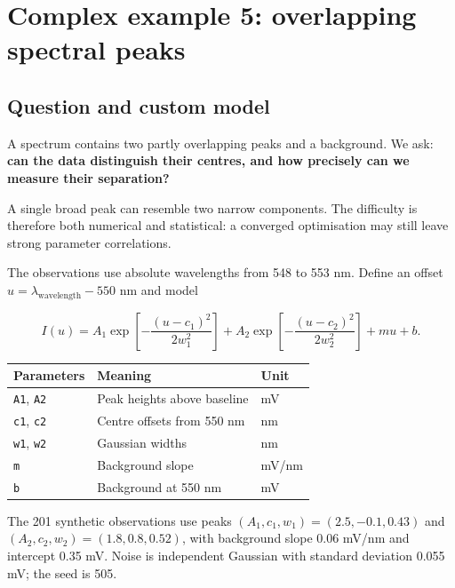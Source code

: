 \documentclass[
  british,
  10pt,
  a4paper,
]{article}
\newcommand{\passthrough}[1]{#1}
\begin{document}
\section{Complex example 5: overlapping spectral
peaks}\label{complex-example-5-overlapping-spectral-peaks}


\subsection{Question and custom model}\label{question-and-custom-model}

A spectrum contains two partly overlapping peaks and a background. We
ask: \textbf{can the data distinguish their centres, and how precisely
can we measure their separation?}

A single broad peak can resemble two narrow components. The difficulty
is therefore both numerical and statistical: a converged optimisation
may still leave strong parameter correlations.

The observations use absolute wavelengths from 548 to 553 nm. Define an
offset \(u=\lambda_{\mathrm{wavelength}}-550\) nm and model

\begin{equation}I(u)=
A_1\exp\left[-\frac{(u-c_1)^2}{2w_1^2}\right]
+A_2\exp\left[-\frac{(u-c_2)^2}{2w_2^2}\right]+mu+b.\end{equation}

\begin{longtable}[]{@{}lll@{}}
\toprule\noalign{}
Parameters & Meaning & Unit \\
\midrule\noalign{}
\endhead
\bottomrule\noalign{}
\endlastfoot
\passthrough{\lstinline!A1!}, \passthrough{\lstinline!A2!} & Peak
heights above baseline & mV \\
\passthrough{\lstinline!c1!}, \passthrough{\lstinline!c2!} & Centre
offsets from 550 nm & nm \\
\passthrough{\lstinline!w1!}, \passthrough{\lstinline!w2!} & Gaussian
widths & nm \\
\passthrough{\lstinline!m!} & Background slope & mV/nm \\
\passthrough{\lstinline!b!} & Background at 550 nm & mV \\
\end{longtable}

The 201 synthetic observations use peaks
\((A_1,c_1,w_1)=(2.5,-0.1,0.43)\) and \((A_2,c_2,w_2)=(1.8,0.8,0.52)\),
with background slope 0.06 mV/nm and intercept 0.35 mV. Noise is
independent Gaussian with standard deviation 0.055 mV; the seed is 505.
\end{document}
